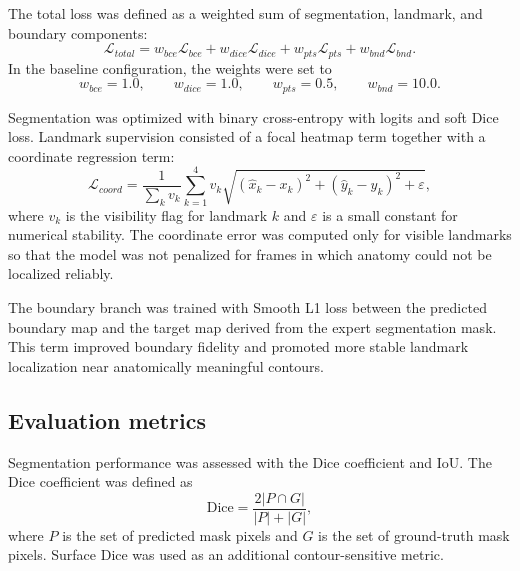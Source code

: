 \documentclass[preprint,12pt,authoryear]{elsarticle}
\begin{document}
The total loss was defined as a weighted sum of segmentation, landmark, and boundary components:
\begin{equation}
\mathcal{L}_{total} =
w_{bce}\mathcal{L}_{bce} +
w_{dice}\mathcal{L}_{dice} +
w_{pts}\mathcal{L}_{pts} +
w_{bnd}\mathcal{L}_{bnd}.
\end{equation}
In the baseline configuration, the weights were set to
\begin{equation}
w_{bce}=1.0,\qquad
w_{dice}=1.0,\qquad
w_{pts}=0.5,\qquad
w_{bnd}=10.0.
\end{equation}

Segmentation was optimized with binary cross-entropy with logits and soft Dice loss. Landmark supervision consisted of a focal heatmap term together with a coordinate regression term:
\begin{equation}
\mathcal{L}_{coord} =
\frac{1}{\sum_k v_k}
\sum_{k=1}^{4}
v_k
\sqrt{
(\hat{x}_k-x_k)^2+(\hat{y}_k-y_k)^2+\varepsilon
},
\end{equation}
where $v_k$ is the visibility flag for landmark $k$ and $\varepsilon$ is a small constant for numerical stability. The coordinate error was computed only for visible landmarks so that the model was not penalized for frames in which anatomy could not be localized reliably.

The boundary branch was trained with Smooth L1 loss between the predicted boundary map and the target map derived from the expert segmentation mask. This term improved boundary fidelity and promoted more stable landmark localization near anatomically meaningful contours.

\subsection{Evaluation metrics}

Segmentation performance was assessed with the Dice coefficient and IoU. The Dice coefficient was defined as
\begin{equation}
\mathrm{Dice} = \frac{2|P \cap G|}{|P| + |G|},
\end{equation}
where $P$ is the set of predicted mask pixels and $G$ is the set of ground-truth mask pixels. Surface Dice was used as an additional contour-sensitive metric.
\end{document}
